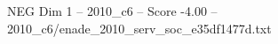 \begin{textsample}{NEG Dim 1 – 2010\_c6 – Score -4.00 – 2010\_c6/enade\_2010\_serv\_soc\_e35df1477d.txt}
\end{textsample}
